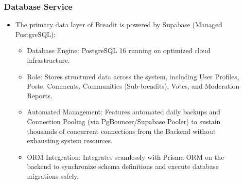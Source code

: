 \subsubsection{Database Service}
\begin{itemize}
  \item The primary data layer of Breadit is powered by Supabase (Managed PostgreSQL):
\begin{itemize}
  \item Database Engine: PostgreSQL 16 running on optimized cloud infrastructure.
  \item Role: Stores structured data across the system, including User Profiles, Posts, Comments, Communities (Sub-breadits), Votes, and Moderation Reports.
  \item Automated Management: Features automated daily backups and Connection Pooling (via PgBouncer/Supabase Pooler) to sustain thousands of concurrent connections from the Backend without exhausting system resources.
  \item ORM Integration: Integrates seamlessly with Prisma ORM on the backend to synchronize schema definitions and execute database migrations safely.
\end{itemize}
\end{itemize}
